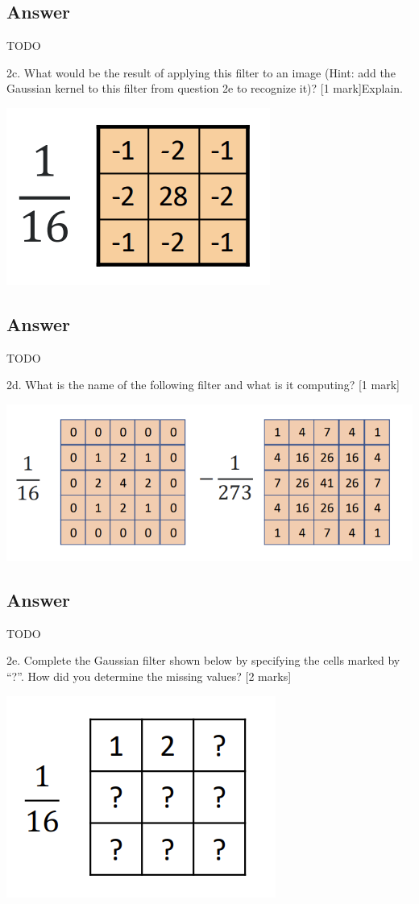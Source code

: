 \documentclass[
	12pt, %
]{fphw}
\begin{document}
\subsection*{Answer}
TODO
\begin{problem}
2c. What would be the result of applying this filter to an image (Hint: add the Gaussian
kernel to this filter from question 2e to recognize it)? [1 mark]Explain.
\begin{center}
	\includegraphics[width=0.5\columnwidth, page=1]{2c.png}
\end{center}
\end{problem}
\subsection*{Answer}
TODO
\begin{problem}
2d. What is the name of the following filter and what is it computing? [1 mark]
\begin{center}
	\includegraphics[width=0.5\columnwidth, page=1]{2d.png}
\end{center}
\end{problem}
\subsection*{Answer}
TODO
\begin{problem}
2e. Complete the Gaussian filter shown below by specifying the cells marked by “?”.
How did you determine the missing values? [2 marks]
\begin{center}
	\includegraphics[width=0.5\columnwidth, page=1]{2e.png}
\end{center}
\end{problem}
\end{document}
